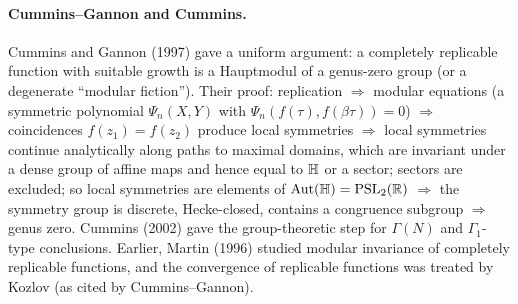 \paragraph{Cummins--Gannon and Cummins.}  Cummins and Gannon (1997) gave a uniform argument: a completely replicable function with
suitable growth is a Hauptmodul of a genus-zero group (or a degenerate ``modular fiction'').  Their proof: replication $\Rightarrow$ modular
equations (a symmetric polynomial $\Psi_n(X,Y)$ with $\Psi_n(f(\tau),f(\beta\tau))=0$) $\Rightarrow$ coincidences $f(z_1)=f(z_2)$ produce local
symmetries $\Rightarrow$ local symmetries continue analytically along paths to maximal domains, which are invariant under a dense group of affine
maps and hence equal to $\mathbb{H}$ or a sector; sectors are excluded; so local symmetries are elements of $\operatorname{Aut}(\mathbb{H})=\mathrm{PSL}_2(\mathbb{R})$
$\Rightarrow$ the symmetry group is discrete, Hecke-closed, contains a congruence subgroup $\Rightarrow$ genus zero.  Cummins (2002) gave the
group-theoretic step for $\Gamma(N)$ and $\Gamma_1$-type conclusions.  Earlier, Martin (1996) studied modular invariance of completely
replicable functions, and the convergence of replicable functions was treated by Kozlov (as cited by Cummins--Gannon).

